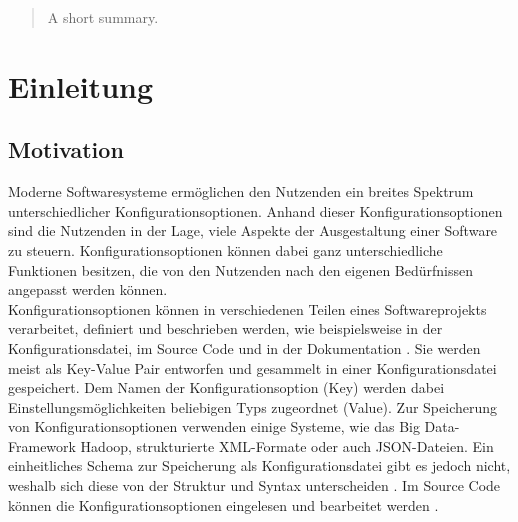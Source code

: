 \documentclass[german,bachelor]{swsLeipzig}
\begin{document}
\begin{frontmatter}
  \begin{abstract}
    A short summary.
  \end{abstract}

  \tableofcontents


  \listoffigures %

  \listoftables %


\end{frontmatter}

\chapter{Einleitung}\label{Einleitung}

\section{Motivation}
Moderne Softwaresysteme erm\"oglichen den Nutzenden ein breites Spektrum unterschiedlicher Konfigurationsoptionen.
Anhand dieser Konfigurationsoptionen sind die Nutzenden in der Lage, viele Aspekte der Ausgestaltung einer Software zu steuern.
Konfigurationsoptionen k\"onnen dabei ganz unterschiedliche Funktionen besitzen, die von den Nutzenden nach den eigenen Bed\"urfnissen angepasst werden k\"onnen.\\

Konfigurationsoptionen können in verschiedenen Teilen eines Softwareprojekts verarbeitet, definiert und beschrieben werden,
wie beispielsweise in der Konfigurationsdatei, im Source Code und in der Dokumentation \cite[]{7774519}.
Sie werden meist als Key-Value Pair entworfen und gesammelt in einer Konfigurationsdatei gespeichert.
Dem Namen der Konfigurationsoption (Key) werden dabei Einstellungsmöglichkeiten beliebigen Typs zugeordnet (Value).
Zur Speicherung von Konfigurationsoptionen verwenden einige Systeme, wie das Big Data-Framework Hadoop, strukturierte XML-Formate oder auch JSON-Dateien.
Ein einheitliches Schema zur Speicherung als Konfigurationsdatei gibt es jedoch nicht, weshalb sich diese von der Struktur und Syntax unterscheiden \cite[]{10.1145/1985793.1985812}.
Im Source Code können die Konfigurationsoptionen eingelesen und bearbeitet werden \cite[]{7774519}.\\
\end{document}
